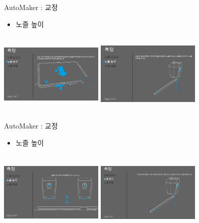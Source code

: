 \documentclass[11pt]{beamer}
\begin{document}
\begin{frame}[t]{AutoMaker : 교정 }\footnotesize
\begin{itemize}
\item 노즐 높이
\end{itemize}
\includegraphics[width=5cm, height=4cm]{./image/17_44.png} \@ \includegraphics[width=5cm, height=4cm]{./image/17_45.png}
\end{frame}

\begin{frame}[t]{AutoMaker : 교정 }\footnotesize
\begin{itemize}
\item 노즐 높이
\end{itemize}
\includegraphics[width=5cm, height=4cm]{./image/17_46.png} \@ \includegraphics[width=5cm, height=4cm]{./image/17_47.png}
\end{frame}
\end{document}
